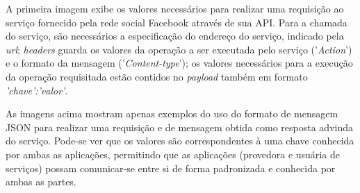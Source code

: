 A primeira imagem exibe os valores necessários para realizar uma requisição ao serviço fornecido pela rede social Facebook através de sua API. Para a chamada do serviço, são necessários a especificação do endereço do serviço, indicado pela \textit{url}; \textit{headers} guarda os valores da operação a ser executada pelo serviço ('\textit{Action}') e o formato da mensagem ('\textit{Content-type}'); os valores necessários para a execução da operação requisitada estão contidos no \textit{payload} também em formato \textit{{'chave':'valor'}}.

As imagens acima mostram apenas exemplos do uso do formato de mensagem JSON para realizar uma requisição e de mensagem obtida como resposta advinda do serviço. Pode-se ver que os valores são correspondentes à uma chave conhecida por ambas as aplicações, permitindo que as aplicações (provedora e usuária de serviços) possam comunicar-se entre si de forma padronizada e conhecida por ambas as partes.
